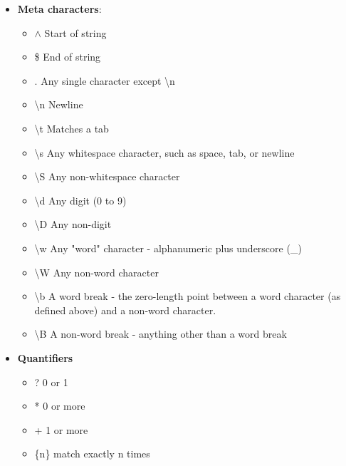 \documentclass{report}
\begin{document}
\begin{itemize}
\begin{itemize}
            \end{itemize}
            You can also activate or deactivate modifiers dynamically inside a regex pattern using the (?imsx-imsx) synt
            \begin{itemize}
                \item (?i)apple matches "Apple" or "APPLE" inline.
                \item (?-i)apple turns off case-insensitivity from that point forward.
            \end{itemize}
        \item \textbf{Meta characters}: 
            \begin{itemize}
                \item $\land$ Start of string
                \item \$ End of string
                \item . Any single character except \textbackslash n
                \item \textbackslash n Newline
                \item \textbackslash t Matches a tab
                \item \textbackslash s Any whitespace character, such as space, tab, or newline
                \item \textbackslash S Any non-whitespace character
                \item \textbackslash d Any digit (0 to 9)
                \item \textbackslash D Any non-digit
                \item \textbackslash w Any "word" character - alphanumeric plus underscore (\_)
                \item \textbackslash W Any non-word character
                \item \textbackslash b A word break - the zero-length point between a word character (as defined above) and a non-word character.
                \item \textbackslash B A non-word break - anything other than a word break
            \end{itemize}
        \item \textbf{Quantifiers}
            \begin{itemize}
                \item ? 0 or 1
                \item * 0 or more
                \item + 1 or more
                \item \{n\} match exactly n times

\end{itemize}
\end{itemize}
\end{document}
